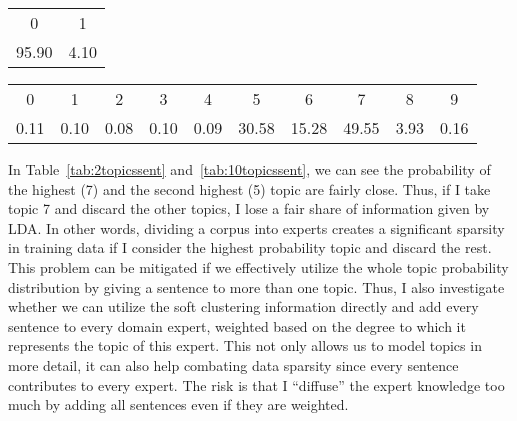 \begin{table*}[!htb]
\centering

\caption{2 topics distribution}
\begin{tabular}{cc}
\\ \hline
0 & 1 \\
95.90 & 4.10 \\ \hline
\end{tabular}
\label{tab:2topicssent}

\caption{10 topics distribution
}
\begin{tabular}{cccccccccc}
\\ \hline

0 & \multicolumn{1}{c}{1} & \multicolumn{1}{c}{2} & \multicolumn{1}{c}{3} & \multicolumn{1}{c}{4} & \multicolumn{1}{c}{5} & \multicolumn{1}{c}{6} & \multicolumn{1}{c}{7} & \multicolumn{1}{c}{8} & \multicolumn{1}{c}{9} \\
0.11 & 0.10 & 0.08 & 0.10 & 0.09 & 30.58 & 15.28 & 49.55 & 3.93 & 0.16 \\ \hline
\end{tabular}
\label{tab:10topicssent}

\end{table*}
 
In Table~\ref{tab:2topicssent} and~\ref{tab:10topicssent}, we can see the probability of the highest (7) and the second highest (5) topic are fairly close. Thus, if I take topic 7 and discard the other topics, I lose a fair share of information given by LDA. In other words, dividing a corpus into experts creates a significant sparsity in training data if I consider the highest probability topic and discard the rest.
This problem can be mitigated if we effectively utilize the whole topic probability distribution by giving a sentence to more than one topic. Thus, I also investigate whether we can utilize the soft clustering information directly and add every sentence to every domain expert, weighted based on the degree to which it represents the topic of this expert. This not only allows us to model topics in more detail, it can also help combating data sparsity since every sentence contributes to every expert. The risk is that I ``diffuse'' the expert knowledge too much by adding all sentences even if they are weighted. 


